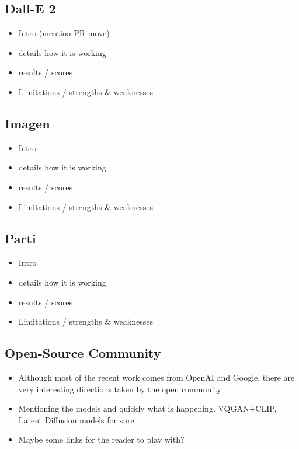 \documentclass[
]{krantz}
\providecommand{\tightlist}{%
  \setlength{\itemsep}{0pt}\setlength{\parskip}{0pt}}
\begin{document}
\hypertarget{dall-e-2}{%
\subsection{Dall-E 2}\label{dall-e-2}}

\begin{itemize}
\tightlist
\item
  Intro (mention PR move)
\item
  details how it is working
\item
  results / scores
\item
  Limitations / strengths \& weaknesses
\end{itemize}

\hypertarget{imagen}{%
\subsection{Imagen}\label{imagen}}

\begin{itemize}
\tightlist
\item
  Intro
\item
  details how it is working
\item
  results / scores
\item
  Limitations / strengths \& weaknesses
\end{itemize}

\hypertarget{parti}{%
\subsection{Parti}\label{parti}}

\begin{itemize}
\tightlist
\item
  Intro
\item
  details how it is working
\item
  results / scores
\item
  Limitations / strengths \& weaknesses
\end{itemize}

\hypertarget{open-source-community}{%
\subsection{Open-Source Community}\label{open-source-community}}

\begin{itemize}
\tightlist
\item
  Although most of the recent work comes from OpenAI and Google, there are very interesting directions taken by the open community
\item
  Mentioning the models and quickly what is happening. VQGAN+CLIP, Latent Diffusion models for sure
\item
  Maybe some links for the reader to play with?
\end{itemize}
\end{document}
